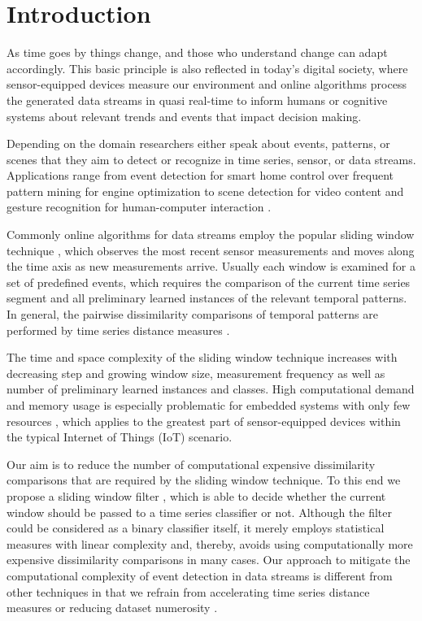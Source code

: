 \section{Introduction} \label{introduction}

As time goes by things change, and those who understand change can adapt accordingly. This basic principle is also reflected in today's digital society, where sensor-equipped devices measure our environment and online algorithms process the generated data streams in quasi real-time to inform humans or cognitive systems about relevant trends and events that impact decision making.

Depending on the domain researchers either speak about events, patterns, or scenes that they aim to detect or recognize in time series, sensor, or data streams. Applications range from event detection for smart home control \cite{spiegel2015metering} over frequent pattern mining for engine optimization \cite{spiegel2015driving} to scene detection for video content \cite{acar2011mediaeval} and gesture recognition for human-computer interaction \cite{liu2009uwave}.

Commonly online algorithms for data streams employ the popular sliding window technique \cite{keogh2004sliding}, which observes the most recent sensor measurements and moves along the time axis as new measurements arrive. Usually each window is examined for a set of predefined events, which requires the comparison of the current time series segment and all preliminary learned instances of the relevant temporal patterns. In general, the pairwise dissimilarity comparisons of temporal patterns are performed by time series distance measures \cite{spiegel2015diss}.

The time and space complexity of the sliding window technique increases with decreasing step and growing window size, measurement frequency as well as number of preliminary learned instances and classes. High computational demand and memory usage is especially problematic for embedded systems with only few resources \cite{kratz2011mobile,wilhelm2015ring}, which applies to the greatest part of sensor-equipped devices within the typical Internet of Things (IoT) scenario.

Our aim is to reduce the number of computational expensive dissimilarity comparisons that are required by the sliding window technique. To this end we propose a sliding window filter \cite{lesti2017filter}, which is able to decide whether the current window should be passed to a time series classifier or not. Although the filter could be considered as a binary classifier itself, it merely employs statistical measures with linear complexity and, thereby, avoids using computationally more expensive dissimilarity comparisons in many cases. Our approach to mitigate the computational complexity of event detection in data streams is different from other techniques in that we refrain from accelerating time series distance measures \cite{sart2010accelerating,spiegel2014lucky} or reducing dataset numerosity \cite{xi2006fast}.

